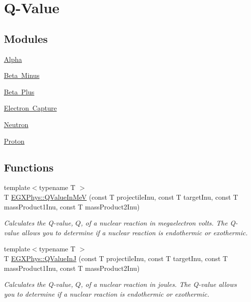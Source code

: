 \hypertarget{group___e_g_x_phys-_q_value}{}\section{Q-\/\+Value}
\label{group___e_g_x_phys-_q_value}
\subsection*{Modules}
\begin{DoxyCompactItemize}
\item 
\mbox{\hyperlink{group___e_g_x_phys-_q_value-_alpha}{Alpha}}
\item 
\mbox{\hyperlink{group___e_g_x_phys-_q_value-_beta_minus}{Beta Minus}}
\item 
\mbox{\hyperlink{group___e_g_x_phys-_q_value-_beta_plus}{Beta Plus}}
\item 
\mbox{\hyperlink{group___e_g_x_phys-_q_value-_electron_capture}{Electron Capture}}
\item 
\mbox{\hyperlink{group___e_g_x_phys-_q_value-_neutron}{Neutron}}
\item 
\mbox{\hyperlink{group___e_g_x_phys-_q_value-_proton}{Proton}}
\end{DoxyCompactItemize}
\subsection*{Functions}
\begin{DoxyCompactItemize}
\item 
{\footnotesize template$<$typename T $>$ }\\T \mbox{\hyperlink{group___e_g_x_phys-_q_value_ga53f07ac44d3d3b217b8c5b7aa548e3fc}{E\+G\+X\+Phys\+::\+Q\+Value\+In\+MeV}} (const T projectile\+Inu, const T target\+Inu, const T mass\+Product1\+Inu, const T mass\+Product2\+Inu)
\begin{DoxyCompactList}\small\item\em Calculates the Q-\/value, $Q$, of a nuclear reaction in megaelectron volts. The Q-\/value allows you to determine if a nuclear reaction is endothermic or exothermic. \end{DoxyCompactList}\item 
{\footnotesize template$<$typename T $>$ }\\T \mbox{\hyperlink{group___e_g_x_phys-_q_value_gaa61414574096631a36ff857b311c435c}{E\+G\+X\+Phys\+::\+Q\+Value\+InJ}} (const T projectile\+Inu, const T target\+Inu, const T mass\+Product1\+Inu, const T mass\+Product2\+Inu)
\begin{DoxyCompactList}\small\item\em Calculates the Q-\/value, $Q$, of a nuclear reaction in joules. The Q-\/value allows you to determine if a nuclear reaction is endothermic or exothermic. \end{DoxyCompactList}\end{DoxyCompactItemize}


